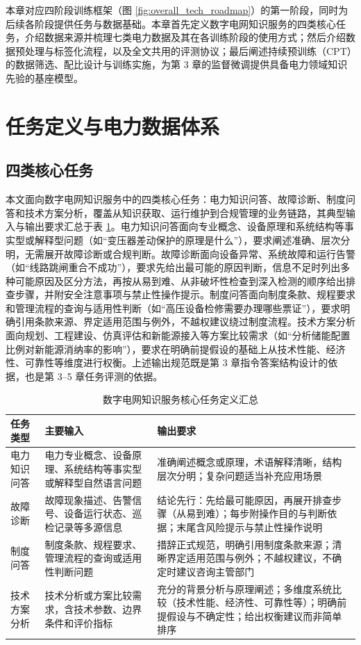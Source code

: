 \documentclass[fontset=fandol,type=master,campus=shenzhen,etitleauto=true]{hithesisbook}
\begin{document}
本章对应四阶段训练框架（图 \ref{fig:overall_tech_roadmap}）的第一阶段，同时为后续各阶段提供任务与数据基础。本章首先定义数字电网知识服务的四类核心任务，介绍数据来源并梳理七类电力数据及其在各训练阶段的使用方式；然后介绍数据预处理与标签化流程，以及全文共用的评测协议；最后阐述持续预训练（CPT）的数据筛选、配比设计与训练实施，为第 3 章的监督微调提供具备电力领域知识先验的基座模型。

\section{任务定义与电力数据体系}\label{sec:task-data}

\subsection{四类核心任务}\label{ux4efbux52a1ux5b9aux4e49}

本文面向数字电网知识服务中的四类核心任务：电力知识问答、故障诊断、制度问答和技术方案分析，覆盖从知识获取、运行维护到合规管理的业务链路，其典型输入与输出要求汇总于表 \ref{tab:task-def}。电力知识问答面向专业概念、设备原理和系统结构等事实型或解释型问题（如``变压器差动保护的原理是什么''），要求阐述准确、层次分明，无需展开故障诊断或合规判断。故障诊断面向设备异常、系统故障和运行告警（如``线路跳闸重合不成功''），要求先给出最可能的原因判断，信息不足时列出多种可能原因及区分方法，再按从易到难、从非破坏性检查到深入检测的顺序给出排查步骤，并附安全注意事项与禁止性操作提示。制度问答面向制度条款、规程要求和管理流程的查询与适用性判断（如``高压设备检修需要办理哪些票证''），要求明确引用条款来源、界定适用范围与例外，不越权建议绕过制度流程。技术方案分析面向规划、工程建设、仿真评估和新能源接入等方案比较需求（如``分析储能配置比例对新能源消纳率的影响''），要求在明确前提假设的基础上从技术性能、经济性、可靠性等维度进行权衡。上述输出规范既是第 3 章指令答案结构设计的依据，也是第 3--5 章任务评测的依据。

\begin{table}[htbp]
\centering
\caption{数字电网知识服务核心任务定义汇总}
\label{tab:task-def}
\small
\begin{tabular}{p{2.5cm}p{4.5cm}p{6.0cm}}
\toprule
\textbf{任务类型} & \textbf{主要输入} & \textbf{输出要求} \\
\midrule
电力知识问答 & 电力专业概念、设备原理、系统结构等事实型或解释型自然语言问题 & 准确阐述概念或原理，术语解释清晰，结构层次分明；复杂问题适当补充应用场景 \\
\addlinespace
故障诊断 & 故障现象描述、告警信号、设备运行状态、巡检记录等多源信息 & 结论先行：先给最可能原因，再展开排查步骤（从易到难）；每步附操作目的与判断依据；末尾含风险提示与禁止性操作说明 \\
\addlinespace
制度问答 & 制度条款、规程要求、管理流程的查询或适用性判断问题 & 措辞正式规范，明确引用制度条款来源；清晰界定适用范围与例外；不越权建议，不确定时建议咨询主管部门 \\
\addlinespace
技术方案分析 & 技术分析或方案比较需求，含技术参数、边界条件和评价指标 & 充分的背景分析与原理阐述；多维度系统比较（技术性能、经济性、可靠性等）；明确前提假设与不确定性；给出权衡建议而非简单排序 \\
\bottomrule
\end{tabular}
\end{table}
\end{document}
